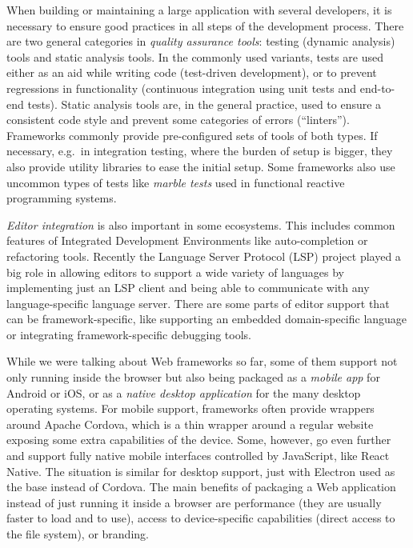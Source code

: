 \documentclass[english,odsaz]{fitthesis}
\begin{document}
When building or maintaining a large application with several developers, it is
necessary to ensure good practices in all steps of the development
process. There are two general categories in \emph{quality assurance tools}: testing
(dynamic analysis) tools and static analysis tools. In the commonly used
variants, tests are used either as an aid while writing code (test-driven
development), or to prevent regressions in functionality (continuous integration
using unit tests and end-to-end tests). Static analysis tools are, in the
general practice, used to ensure a consistent code style and prevent some
categories of errors (``linters''). Frameworks commonly provide pre-configured
sets of tools of both types. If necessary, e.g.~in integration testing, where the
burden of setup is bigger, they also provide utility libraries to ease the
initial setup. Some frameworks also use uncommon types of tests like \emph{marble
tests} used in functional reactive programming systems.

\emph{Editor integration} is also important in some ecosystems. This includes common
features of Integrated Development Environments like auto-completion or
refactoring tools. Recently the Language Server Protocol (LSP) \cite{lsp} project
played a big role in allowing editors to support a wide variety of languages by
implementing just an LSP client and being able to communicate with any
language-specific language server. There are some parts of editor support that
can be framework-specific, like supporting an embedded domain-specific language
or integrating framework-specific debugging tools.

While we were talking about Web frameworks so far, some of them support not only
running inside the browser but also being packaged as a \emph{mobile app} for Android
or iOS, or as a \emph{native desktop application} for the many desktop operating
systems. For mobile support, frameworks often provide wrappers around Apache
Cordova, which is a thin wrapper around a regular website exposing some extra
capabilities of the device. Some, however, go even further and support fully
native mobile interfaces controlled by JavaScript, like React Native. The
situation is similar for desktop support, just with Electron used as the base
instead of Cordova. The main benefits of packaging a Web application instead of
just running it inside a browser are performance (they are usually faster to
load and to use), access to device-specific capabilities (direct access to the
file system), or branding.
\end{document}

